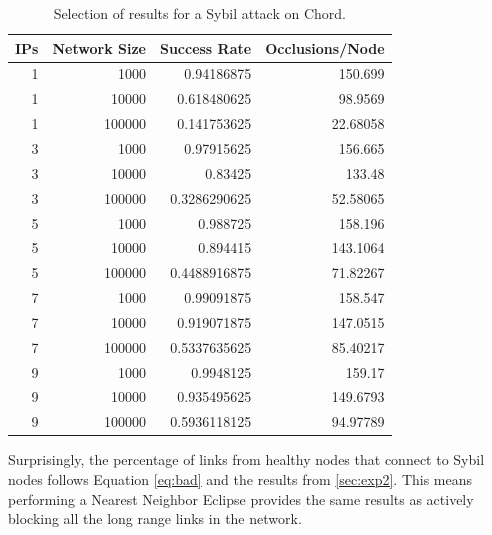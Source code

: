 \begin{table}\small
	
	\caption{Selection of results for a Sybil attack on Chord.} %
	\label{tab:exp3}
	
	\begin{tabular}{|r|r|r|r|}
		\hline 
		IPs & Network Size &   Success Rate & Occlusions/Node \\ \hline
		1 & 1000 & 0.94186875 & 150.699 \\ \hline
		1 & 10000 & 0.618480625 & 98.9569 \\ \hline
		1 & 100000 & 0.141753625 & 22.68058 \\ \hline
		3 & 1000 & 0.97915625 & 156.665 \\ \hline
		3 & 10000 & 0.83425 & 133.48 \\ \hline
		3 & 100000 & 0.3286290625 & 52.58065 \\ \hline
		5 & 1000 & 0.988725 & 158.196 \\ \hline
		5 & 10000 & 0.894415 & 143.1064 \\ \hline
		5 & 100000 & 0.4488916875 & 71.82267 \\ \hline
		7 & 1000 & 0.99091875 & 158.547 \\ \hline
		7 & 10000 & 0.919071875 & 147.0515 \\ \hline
		7 & 100000 & 0.5337635625 & 85.40217 \\ \hline
		9 & 1000 & 0.9948125 & 159.17 \\ \hline
		9 & 10000 & 0.935495625 & 149.6793 \\ \hline
		9 & 100000 & 0.5936118125 & 94.97789 \\ \hline
		
		
	\end{tabular}
	
	
	
\end{table}





Surprisingly, the percentage of links from healthy nodes that connect to Sybil nodes follows Equation \ref{eq:bad} and the results from \ref{sec:exp2}.
This means performing a Nearest Neighbor Eclipse provides the same results as actively blocking all the long range links in the network.

